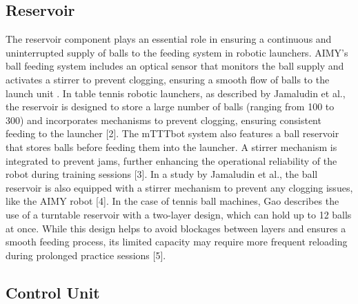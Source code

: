 \documentclass[12pt]{article}
\begin{document}
\subsection{Reservoir}

The reservoir component plays an essential role in ensuring a continuous and uninterrupted supply of balls to the feeding system in robotic launchers. AIMY’s ball feeding system includes an optical sensor that monitors the ball supply and activates a stirrer to prevent clogging, ensuring a smooth flow of balls to the launch unit \cite{Dittrich2023}. In table tennis robotic launchers, as described by Jamaludin et al., the reservoir is designed to store a large number of balls (ranging from 100 to 300) and incorporates mechanisms to prevent clogging, ensuring consistent feeding to the launcher [2]. The mTTTbot system also features a ball reservoir that stores balls before feeding them into the launcher. A stirrer mechanism is integrated to prevent jams, further enhancing the operational reliability of the robot during training sessions [3]. In a study by Jamaludin et al., the ball reservoir is also equipped with a stirrer mechanism to prevent any clogging issues, like the AIMY robot [4]. In the case of tennis ball machines, Gao describes the use of a turntable reservoir with a two-layer design, which can hold up to 12 balls at once. While this design helps to avoid blockages between layers and ensures a smooth feeding process, its limited capacity may require more frequent reloading during prolonged practice sessions [5]. 

\subsection{Control Unit}
\end{document}
